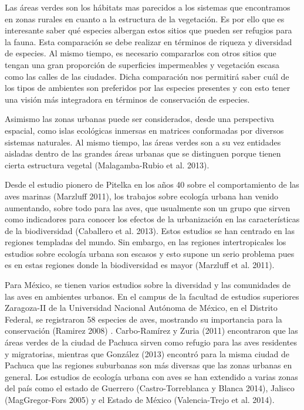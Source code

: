 \documentclass[letterpaper,12pt]{article}
\begin{document}
Las áreas verdes son los hábitats mas parecidos a los sistemas que encontramos en zonas rurales en cuanto a la estructura de la vegetación. Es por ello que es interesante saber qué especies albergan estos sitios que pueden ser refugios para la fauna. Esta comparación se debe realizar en términos de riqueza y diversidad de especies. Al mismo tiempo, es necesario compararlos con otros sitios que tengan una gran proporción de superficies impermeables y vegetación escasa como las calles de las ciudades. Dicha comparación nos permitirá saber cuál de los tipos de ambientes son preferidos por las especies presentes y con esto tener una visión más integradora en términos de conservación de especies.

Asimismo las zonas urbanas puede ser considerados, desde una perspectiva espacial, como islas ecológicas inmersas en matrices conformadas por diversos sistemas naturales. Al mismo tiempo, las áreas verdes son a su vez entidades aisladas dentro de las grandes áreas urbanas que se distinguen porque tienen cierta estructura vegetal (Malagamba-Rubio et al.  2013).

Desde el estudio pionero de Pitelka en los años 40 sobre el comportamiento de las aves marinas (Marzluff 2011), los trabajos sobre ecología urbana han venido aumentando, sobre todo para  las aves, que usualmente son un grupo que sirven  como indicadores para conocer los efectos de la urbanización en las  características de la biodiversidad (Caballero et al. 2013). Estos estudios se han centrado en las regiones templadas del mundo. Sin embargo, en las regiones intertropicales los estudios sobre ecología urbana son escasos y esto supone un serio problema pues es en estas regiones donde la biodiversidad es mayor (Marzluff et al. 2011).

Para  México, se tienen varios estudios sobre la diversidad y las comunidades de las aves en ambientes urbanos. En el campus de la facultad de estudios superiores Zaragoza-II de la Universidad Nacional Autónoma de México, en el Distrito Federal, se registraron 58 especies de aves, mostrando su importancia para la conservación (Ramirez 2008) . Carbo-Ramírez y Zuria  (2011) encontraron que las áreas verdes de  la ciudad de Pachuca sirven como refugio para las aves residentes y migratorias, mientras que González (2013)  encontró para la misma ciudad de Pachuca que las regiones suburbanas son más diversas que las zonas urbanas en general. Los estudios de ecología urbana con aves se han extendido a  varias zonas del país como el estado de  Guerrero (Castro-Torreblanca y Blanca 2014), Jalisco (MagGregor-Fors 2005) y el Estado de México (Valencia-Trejo et al. 2014).
\end{document}

